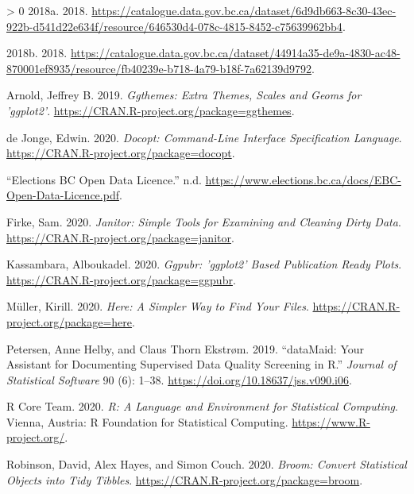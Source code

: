 \documentclass[
]{article}
\newlength{\cslhangindent}
\newenvironment{CSLReferences}[3] %
 {%
  \setlength{\parindent}{0pt}
  \ifodd #1 \everypar{\setlength{\hangindent}{\cslhangindent}}\ignorespaces\fi
  \ifnum #2 > 0
  \setlength{\parskip}{#3\baselineskip}
  \fi
 }%
 {}
\begin{document}
\hypertarget{refs}{}
\begin{CSLReferences}{1}{0}
\leavevmode\hypertarget{ref-pvp}{}%
2018a. 2018.
\url{https://catalogue.data.gov.bc.ca/dataset/6d9db663-8c30-43ec-922b-d541d22e634f/resource/646530d4-078c-4815-8452-c75639962bb4}.

\leavevmode\hypertarget{ref-pvr}{}%
2018b. 2018.
\url{https://catalogue.data.gov.bc.ca/dataset/44914a35-de9a-4830-ac48-870001ef8935/resource/fb40239e-b718-4a79-b18f-7a62139d9792}.

\leavevmode\hypertarget{ref-ggthemes}{}%
Arnold, Jeffrey B. 2019. \emph{Ggthemes: Extra Themes, Scales and Geoms
for 'ggplot2'}. \url{https://CRAN.R-project.org/package=ggthemes}.

\leavevmode\hypertarget{ref-docopt}{}%
de Jonge, Edwin. 2020. \emph{Docopt: Command-Line Interface
Specification Language}.
\url{https://CRAN.R-project.org/package=docopt}.

\leavevmode\hypertarget{ref-BC_elections_license}{}%
{``Elections BC Open Data Licence.''} n.d.
\url{https://www.elections.bc.ca/docs/EBC-Open-Data-Licence.pdf}.

\leavevmode\hypertarget{ref-janitor}{}%
Firke, Sam. 2020. \emph{Janitor: Simple Tools for Examining and Cleaning
Dirty Data}. \url{https://CRAN.R-project.org/package=janitor}.

\leavevmode\hypertarget{ref-ggpubr}{}%
Kassambara, Alboukadel. 2020. \emph{Ggpubr: 'ggplot2' Based Publication
Ready Plots}. \url{https://CRAN.R-project.org/package=ggpubr}.

\leavevmode\hypertarget{ref-here}{}%
Müller, Kirill. 2020. \emph{Here: A Simpler Way to Find Your Files}.
\url{https://CRAN.R-project.org/package=here}.

\leavevmode\hypertarget{ref-dataMaid}{}%
Petersen, Anne Helby, and Claus Thorn Ekstrøm. 2019. {``{dataMaid}: Your
Assistant for Documenting Supervised Data Quality Screening in {R}.''}
\emph{Journal of Statistical Software} 90 (6): 1--38.
\url{https://doi.org/10.18637/jss.v090.i06}.

\leavevmode\hypertarget{ref-R}{}%
R Core Team. 2020. \emph{R: A Language and Environment for Statistical
Computing}. Vienna, Austria: R Foundation for Statistical Computing.
\url{https://www.R-project.org/}.

\leavevmode\hypertarget{ref-broom}{}%
Robinson, David, Alex Hayes, and Simon Couch. 2020. \emph{Broom: Convert
Statistical Objects into Tidy Tibbles}.
\url{https://CRAN.R-project.org/package=broom}.


\end{CSLReferences}
\end{document}
